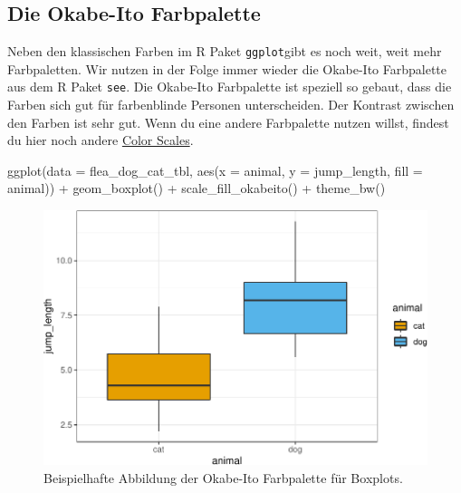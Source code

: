 \documentclass[
  letterpaper,
  DIV=11,
  oneside]{scrreport}
\newenvironment{Shaded}{\begin{snugshade}}{\end{snugshade}}
\newcommand{\AttributeTok}[1]{\textcolor[rgb]{0.40,0.45,0.13}{#1}}
\newcommand{\FunctionTok}[1]{\textcolor[rgb]{0.28,0.35,0.67}{#1}}
\newcommand{\NormalTok}[1]{\textcolor[rgb]{0.00,0.23,0.31}{#1}}
\newcommand{\SpecialCharTok}[1]{\textcolor[rgb]{0.37,0.37,0.37}{#1}}
\begin{document}
\hypertarget{die-okabe-ito-farbpalette}{%
\subsection{Die Okabe-Ito Farbpalette}\label{die-okabe-ito-farbpalette}}


Neben den klassischen Farben im R Paket \texttt{ggplot}gibt es noch
weit, weit mehr Farbpaletten. Wir nutzen in der Folge immer wieder die
Okabe-Ito Farbpalette aus dem R Paket \texttt{see}. Die Okabe-Ito
Farbpalette ist speziell so gebaut, dass die Farben sich gut für
farbenblinde Personen unterscheiden. Der Kontrast zwischen den Farben
ist sehr gut. Wenn du eine andere Farbpalette nutzen willst, findest du
hier noch andere
\href{https://easystats.github.io/see/articles/seecolorscales.html}{Color
Scales}.

\begin{Shaded}
\begin{Highlighting}[]
\FunctionTok{ggplot}\NormalTok{(}\AttributeTok{data =}\NormalTok{ flea\_dog\_cat\_tbl, }
       \FunctionTok{aes}\NormalTok{(}\AttributeTok{x =}\NormalTok{ animal, }\AttributeTok{y =}\NormalTok{ jump\_length,}
           \AttributeTok{fill =}\NormalTok{ animal)) }\SpecialCharTok{+}
  \FunctionTok{geom\_boxplot}\NormalTok{() }\SpecialCharTok{+}
  \FunctionTok{scale\_fill\_okabeito}\NormalTok{() }\SpecialCharTok{+}
  \FunctionTok{theme\_bw}\NormalTok{()}
\end{Highlighting}
\end{Shaded}

\begin{figure}[H]

{\centering \includegraphics{./eda-ggplot_files/figure-pdf/fig-labels-see-0-1.pdf}

}

\caption{\label{fig-labels-see-0}Beispielhafte Abbildung der Okabe-Ito
Farbpalette für Boxplots.}

\end{figure}
\end{document}
